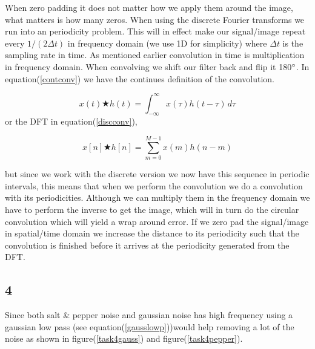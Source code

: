 {When zero padding it does not matter how we apply them around the image, what matters is how many zeros. When using the discrete Fourier transforms we run into an periodicity problem. This will in effect make our signal/image repeat every $1/(2\Delta t)$ in frequency domain (we use 1D for simplicity) where $\Delta t$ is the sampling rate in time. As mentioned earlier convolution in time is multiplication in frequency domain. When convolving we shift our filter back and flip it 180$\degree$. In equation(\ref{contconv}) we have the continues definition of the convolution.

\begin{equation}
    x(t) \bigstar h(t) = \int_{-\infty}^{\infty} x(\tau)h(t - \tau)\, d\tau
    \label{contconv}
\end{equation}
or the DFT in equation(\ref{discconv}),

\begin{equation}
    x[n] \bigstar h[n] = \sum_{m = 0}^{M-1} x(m)h(n - m)
    \label{discconv}
\end{equation}

but since we work with the discrete version we now have this sequence in periodic intervals, this means that when we perform the convolution we do a convolution with its periodicities. Although we can multiply them in the frequency domain we have to perform the inverse to get the image, which will in turn do the circular convolution which will yield a wrap around error. If we zero pad the signal/image in spatial/time domain we increase the distance to its periodicity such that the convolution is finished before it arrives at the periodicity generated from the DFT.


\subsection{4}

Since both salt \& pepper noise and gaussian noise has high frequency using a gaussian low pass (see equation(\ref{gausslowp}))would help removing a lot of the noise as shown in figure(\ref{task4gauss}) and figure(\ref{task4pepper}).

}
